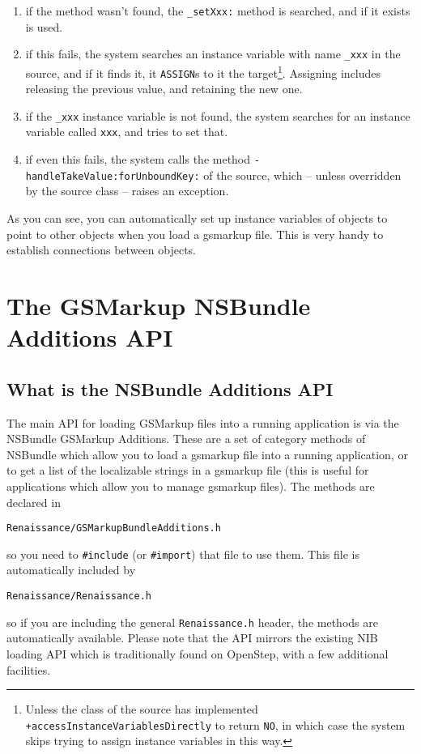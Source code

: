 \begin{enumerate}
\begin{enumerate}
\item if the method wasn't found, the \texttt{\_setXxx:} method is
  searched, and if it exists is used.
\item if this fails, the system searches an instance variable with
  name \texttt{\_xxx} in the source, and if it finds it, it
  \texttt{ASSIGN}s to it the target\footnote{Unless the class of the
    source has implemented \texttt{+accessInstanceVariablesDirectly}
    to return \texttt{NO}, in which case the system skips trying to
    assign instance variables in this way.}.  Assigning includes
  releasing the previous value, and retaining the new one.
\item if the \texttt{\_xxx} instance variable is not found, the system
  searches for an instance variable called \texttt{xxx}, and tries to
  set that.
\item if even this fails, the system calls the method
  \texttt{-handleTakeValue:forUnboundKey:} of the source, which --
  unless overridden by the source class -- raises an exception.
\end{enumerate}
\end{enumerate}
As you can see, you can automatically set up instance variables of
objects to point to other objects when you load a gsmarkup file.  This is
very handy to establish connections between objects.

\section{The GSMarkup NSBundle Additions API}

\subsection{What is the NSBundle Additions API}
The main API for loading GSMarkup files into a running application is via
the NSBundle GSMarkup Additions.  These are a set of category methods of
NSBundle which allow you to load a gsmarkup file into a running
application, or to get a list of the localizable strings in a gsmarkup
file (this is useful for applications which allow you to manage gsmarkup
files).  The methods are declared in
\begin{verbatim}
Renaissance/GSMarkupBundleAdditions.h
\end{verbatim}
so you need to \texttt{\#include} (or \texttt{\#import}) that file to
use them.  This file is automatically included by
\begin{verbatim}
Renaissance/Renaissance.h
\end{verbatim}
so if you are including the general \texttt{Renaissance.h} header, the
methods are automatically available.  Please note that the API mirrors
the existing NIB loading API which is traditionally found on OpenStep,
with a few additional facilities.

